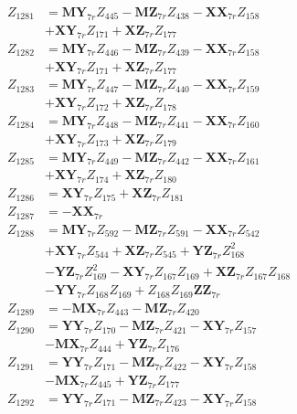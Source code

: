 \begin{multicols}{2}
\begin{align}
Z_{1281} &= \mathbf{MY}_{7r}Z_{445} - \mathbf{MZ}_{7r}Z_{438} - \mathbf{XX}_{7r}Z_{158}  \nonumber \\
&+ \mathbf{XY}_{7r}Z_{171} + \mathbf{XZ}_{7r}Z_{177} \nonumber \\
Z_{1282} &= \mathbf{MY}_{7r}Z_{446} - \mathbf{MZ}_{7r}Z_{439} - \mathbf{XX}_{7r}Z_{158}  \nonumber \\
&+ \mathbf{XY}_{7r}Z_{171} + \mathbf{XZ}_{7r}Z_{177} \nonumber \\
Z_{1283} &= \mathbf{MY}_{7r}Z_{447} - \mathbf{MZ}_{7r}Z_{440} - \mathbf{XX}_{7r}Z_{159}  \nonumber \\
&+ \mathbf{XY}_{7r}Z_{172} + \mathbf{XZ}_{7r}Z_{178} \nonumber \\
Z_{1284} &= \mathbf{MY}_{7r}Z_{448} - \mathbf{MZ}_{7r}Z_{441} - \mathbf{XX}_{7r}Z_{160}  \nonumber \\
&+ \mathbf{XY}_{7r}Z_{173} + \mathbf{XZ}_{7r}Z_{179} \nonumber \\
Z_{1285} &= \mathbf{MY}_{7r}Z_{449} - \mathbf{MZ}_{7r}Z_{442} - \mathbf{XX}_{7r}Z_{161}  \nonumber \\
&+ \mathbf{XY}_{7r}Z_{174} + \mathbf{XZ}_{7r}Z_{180} \nonumber \\
Z_{1286} &= \mathbf{XY}_{7r}Z_{175} + \mathbf{XZ}_{7r}Z_{181} \nonumber \\
Z_{1287} &= -\mathbf{XX}_{7r} \nonumber \\
Z_{1288} &= \mathbf{MY}_{7r}Z_{592} - \mathbf{MZ}_{7r}Z_{591} - \mathbf{XX}_{7r}Z_{542}  \nonumber \\
&+ \mathbf{XY}_{7r}Z_{544} + \mathbf{XZ}_{7r}Z_{545} + \mathbf{YZ}_{7r}Z_{168}^2  \nonumber \\
&- \mathbf{YZ}_{7r}Z_{169}^2 - \mathbf{XY}_{7r}Z_{167}Z_{169} + \mathbf{XZ}_{7r}Z_{167}Z_{168}  \nonumber \\
&- \mathbf{YY}_{7r}Z_{168}Z_{169} + Z_{168}Z_{169}\mathbf{ZZ}_{7r} \nonumber \\
Z_{1289} &= - \mathbf{MX}_{7r}Z_{443} - \mathbf{MZ}_{7r}Z_{420} \nonumber \\
Z_{1290} &= \mathbf{YY}_{7r}Z_{170} - \mathbf{MZ}_{7r}Z_{421} - \mathbf{XY}_{7r}Z_{157}  \nonumber \\
&- \mathbf{MX}_{7r}Z_{444} + \mathbf{YZ}_{7r}Z_{176} \nonumber \\
Z_{1291} &= \mathbf{YY}_{7r}Z_{171} - \mathbf{MZ}_{7r}Z_{422} - \mathbf{XY}_{7r}Z_{158}  \nonumber \\
&- \mathbf{MX}_{7r}Z_{445} + \mathbf{YZ}_{7r}Z_{177} \nonumber \\
Z_{1292} &= \mathbf{YY}_{7r}Z_{171} - \mathbf{MZ}_{7r}Z_{423} - \mathbf{XY}_{7r}Z_{158}  \nonumber \\

\end{align}
\end{multicols}
